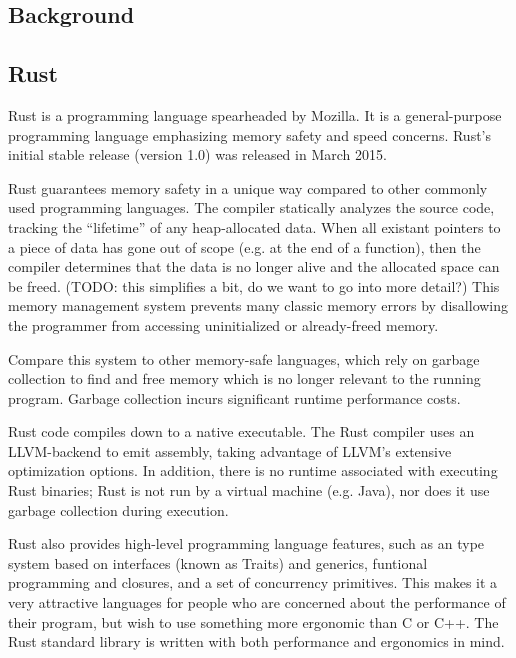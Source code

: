 \documentclass{article}
\begin{document}
\begin{multicols}{2}
\section{Background}

\subsection{Rust}

Rust is a programming language spearheaded by Mozilla. It is a
general-purpose programming language emphasizing memory safety and speed
concerns. Rust's initial stable release (version 1.0) was released in March
2015. \newline

Rust guarantees memory safety in a unique way compared to other commonly used
programming languages. The compiler statically analyzes the source code,
tracking the ``lifetime'' of any heap-allocated data. When all existant pointers
to a piece of data has gone out of scope (e.g. at the end of a function), then
the compiler determines that the data is no longer alive and the allocated space
can be freed. (TODO: this simplifies a bit, do we want to go into more detail?)
This memory management system prevents many classic memory errors by disallowing
the programmer from accessing uninitialized or already-freed memory. \newline

Compare this system to other memory-safe languages, which rely on garbage
collection to find and free memory which is no longer relevant to the running
program. Garbage collection incurs significant runtime performance costs.
\newline

Rust code compiles down to a native executable. The Rust compiler uses an
LLVM-backend to emit assembly, taking advantage of LLVM's extensive optimization
options. In addition, there is no runtime associated with executing Rust
binaries; Rust is not run by a virtual machine (e.g. Java), nor does it use
garbage collection during execution. \newline

Rust also provides high-level programming language features, such as an type
system based on interfaces (known as Traits) and generics, funtional programming
and closures, and a set of concurrency primitives. This makes it a very
attractive languages for people who are concerned about the performance of their
program, but wish to use something more ergonomic than C or C++. The Rust
standard library is written with both performance and ergonomics in mind.


\end{multicols}
\end{document}
